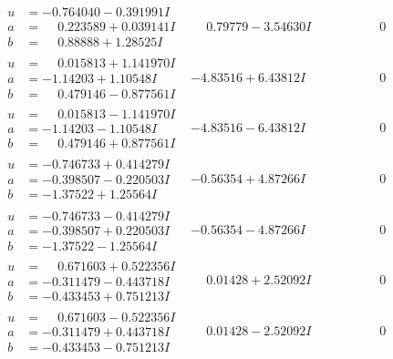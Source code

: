 \documentclass[1p]{elsarticle_modified}
\theoremstyle{definition}
\begin{document}
$$\begin{array}{c|c|c}
\begin{aligned}
u &= -0.764040 - 0.391991 I \\
a &= \phantom{-}0.223589 + 0.039141 I \\
b &= \phantom{-}0.88888 + 1.28525 I\end{aligned}
 & \phantom{-}0.79779 - 3.54630 I & \phantom{-0.000000 } 0 \\ \hline\begin{aligned}
u &= \phantom{-}0.015813 + 1.141970 I \\
a &= -1.14203 + 1.10548 I \\
b &= \phantom{-}0.479146 - 0.877561 I\end{aligned}
 & -4.83516 + 6.43812 I & \phantom{-0.000000 } 0 \\ \hline\begin{aligned}
u &= \phantom{-}0.015813 - 1.141970 I \\
a &= -1.14203 - 1.10548 I \\
b &= \phantom{-}0.479146 + 0.877561 I\end{aligned}
 & -4.83516 - 6.43812 I & \phantom{-0.000000 } 0 \\ \hline\begin{aligned}
u &= -0.746733 + 0.414279 I \\
a &= -0.398507 - 0.220503 I \\
b &= -1.37522 + 1.25564 I\end{aligned}
 & -0.56354 + 4.87266 I & \phantom{-0.000000 } 0 \\ \hline\begin{aligned}
u &= -0.746733 - 0.414279 I \\
a &= -0.398507 + 0.220503 I \\
b &= -1.37522 - 1.25564 I\end{aligned}
 & -0.56354 - 4.87266 I & \phantom{-0.000000 } 0 \\ \hline\begin{aligned}
u &= \phantom{-}0.671603 + 0.522356 I \\
a &= -0.311479 - 0.443718 I \\
b &= -0.433453 + 0.751213 I\end{aligned}
 & \phantom{-}0.01428 + 2.52092 I & \phantom{-0.000000 } 0 \\ \hline\begin{aligned}
u &= \phantom{-}0.671603 - 0.522356 I \\
a &= -0.311479 + 0.443718 I \\
b &= -0.433453 - 0.751213 I\end{aligned}
 & \phantom{-}0.01428 - 2.52092 I & \phantom{-0.000000 } 0\\

\end{array}$$
\end{document}
